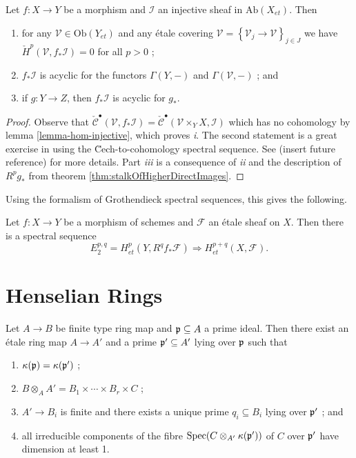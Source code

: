 \begin{lemma}
Let $f: X\to Y$ be a morphism and $\mathcal{I}$ an injective sheaf in 
$\text{Ab}(X_{et})$. Then 
\begin{enumerate}
\item 
for any $\mathcal{V}\in\text{Ob}(Y_{et})$ and any \'etale covering 
$\mathcal{V}=\left\{\mathcal{V}_j\to \mathcal{V}\right\}_{j\in J}$  we have 
$\check H^p(\mathcal{V}, f_*\mathcal{I}) = 0$ for all $p>0$ ;
\item 
$f_*\mathcal{I}$ is acyclic for the functors $\Gamma(Y, -)$ and 
$\Gamma(\mathcal{V},-)$ ; and 
\item 
if $g: Y\to Z$, then $f_*\mathcal{I}$ is acyclic for $g_*$.
\end{enumerate}
\end{lemma}

\begin{proof}
Observe that $\check{\mathcal{C}}^\bullet(\mathcal{V}, f_*\mathcal{I}) = 
\check{\mathcal{C}}^\bullet(\mathcal{V}\times_Y X, \mathcal{I})$ which has no 
cohomology by lemma \ref{lemma-hom-injective}, which proves {\it i}. The 
second statement is a great exercise in using the \u Cech-to-cohomology 
spectral sequence. See (insert future reference) for more details. Part {\it 
iii} is a consequence of {\it ii} and the description of $R^pg_*$ from theorem 
\ref{thm:stalkOfHigherDirectImages}. 
\end{proof}

\noindent
Using the formalism of Grothendieck spectral sequences, this gives the 
following.

\begin{proposition}
Let $f: X \to Y$ be a morphism of schemes and $\mathcal{F}$ an \'etale sheaf on 
$X$. Then there is a spectral sequence
$$
E_2^{p,q} = H_{et}^p(Y, R^qf_*\mathcal{F}) \Rightarrow H_{et}^{p+q}(X, 
\mathcal{F}).
$$
\end{proposition}

\section{Henselian Rings}
\label{section-heselian-ring}

\begin{theorem} 
Let $A\to B$ be finite type ring map and $\frak p \subseteq A$ a prime ideal. 
Then there exist an \'etale ring map $A \to A'$ and a prime $\frak p' \subseteq 
A'$ lying over $\frak p$ such that 
\begin{enumerate}
\item 
$\kappa(\frak p) = \kappa(\frak p')$ ;
\item 
$ B \otimes_A A' = B_1\times \cdots \times B_r \times C$ ;
\item 
$ A'\to B_i$ is finite and there exists a unique prime $q_i\subseteq B_i$ lying 
over $\frak p'$ ; and
\item 
all irreducible components of the fibre $\text{Spec}(C\otimes_{A'} \kappa(\frak 
p'))$ of $C$ over $\frak p'$ have dimension at least 1.
\end{enumerate}
\end{theorem}

